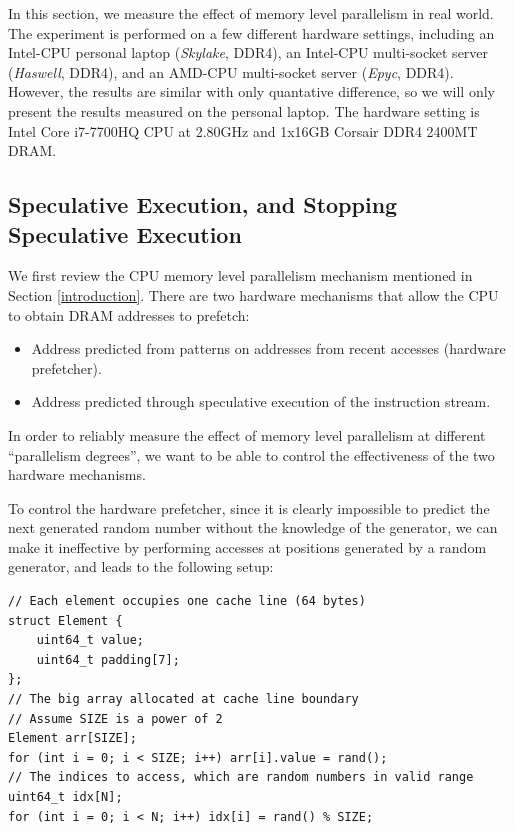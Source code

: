 \documentclass[11pt, usletter]{article}
\begin{document}
In this section, we measure the effect of memory level parallelism in real world. 
The experiment is performed on a few different hardware settings, 
including an Intel-CPU personal laptop (\textit{Skylake}, DDR4), 
an Intel-CPU multi-socket server (\textit{Haswell}, DDR4), and an AMD-CPU multi-socket server (\textit{Epyc}, DDR4).
However, the results are similar with only quantative difference, 
so we will only present the results measured on the personal laptop.
The hardware setting is Intel Core i7-7700HQ CPU at 2.80GHz and 1x16GB Corsair DDR4 2400MT DRAM.
 
\subsection{Speculative Execution, and Stopping Speculative Execution} \label{specexec}
We first review the CPU memory level parallelism mechanism mentioned in Section \ref{introduction}.
There are two hardware mechanisms that allow the CPU to obtain DRAM addresses to prefetch:
\begin{itemize}
[topsep=0pt,partopsep=0pt,itemsep=0pt,parsep=0pt,fullwidth,itemindent=\parindent,listparindent=\parindent]
\item Address predicted from patterns on addresses from recent accesses (hardware prefetcher).
\item Address predicted through speculative execution of the instruction stream.
\end{itemize}
In order to reliably measure the effect of memory level parallelism at different ``parallelism degrees'', 
we want to be able to control the effectiveness of the two hardware mechanisms.

To control the hardware prefetcher, 
since it is clearly impossible to predict the next generated random number without the knowledge of the generator,
we can make it ineffective by performing accesses at positions generated by a random generator, 
and leads to the following setup:

\singlespacing\begin{codebox}
\begin{verbatim}
// Each element occupies one cache line (64 bytes)
struct Element {
    uint64_t value;
    uint64_t padding[7];
};	
// The big array allocated at cache line boundary
// Assume SIZE is a power of 2
Element arr[SIZE];
for (int i = 0; i < SIZE; i++) arr[i].value = rand();	
// The indices to access, which are random numbers in valid range
uint64_t idx[N];
for (int i = 0; i < N; i++) idx[i] = rand() % SIZE;
\end{verbatim}
\end{codebox}\doublespacing
\end{document}
